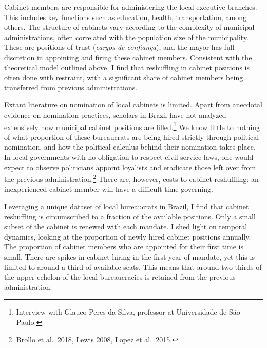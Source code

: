 \documentclass[12pt,]{book}
\let\rmarkdownfootnote\footnote%
\def\footnote{\protect\rmarkdownfootnote}
\begin{document}
Cabinet members are responsible for administering the local executive branches. This includes key functions such as education, health, transportation, among others. The structure of cabinets vary according to the complexity of municipal administrations, often correlated with the population size of the municipality. These are positions of trust (\textit{cargos de confiança}), and the mayor has full discretion in appointing and firing these cabinet members. Consistent with the theoretical model outlined above, I find that reshuffling in cabinet positions is often done with restraint, with a significant share of cabinet members being transferred from previous administrations.

Extant literature on nomination of local cabinets is limited. Apart from anecdotal evidence on nomination practices, scholars in Brazil have not analyzed extensively how municipal cabinet positions are filled.\footnote{Interview with Glauco Peres da Silva, professor at Universidade de São Paulo.} We know little to nothing of what proportion of these bureaucrats are being hired strictly through political nomination, and how the political calculus behind their nomination takes place. In local governments with no obligation to respect civil service laws, one would expect to observe politicians appoint loyalists and eradicate those left over from the previous administration.\footnote{Brollo et al.~2018, Lewis 2008, Lopez et al.~2015.} There are, however, costs to cabinet reshuffling: an inexperienced cabinet member will have a difficult time governing.

Leveraging a unique dataset of local bureaucrats in Brazil, I find that cabinet reshuffling is circumscribed to a fraction of the available positions. Only a small subset of the cabinet is renewed with each mandate. I shed light on temporal dynamics, looking at the proportion of newly hired cabinet positions annually. The proportion of cabinet members who are appointed for their first time is small. There are spikes in cabinet hiring in the first year of mandate, yet this is limited to around a third of available seats. This means that around two thirds of the upper echelon of the local bureaucracies is retained from the previous administration.
\end{document}
